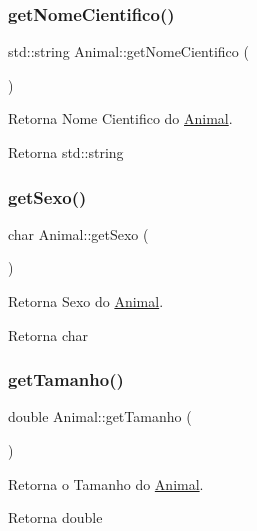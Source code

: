 \subsubsection{\texorpdfstring{get\+Nome\+Cientifico()}{getNomeCientifico()}}
{\footnotesize\ttfamily std\+::string Animal\+::get\+Nome\+Cientifico (\begin{DoxyParamCaption}{ }\end{DoxyParamCaption})}



Retorna Nome Cientifico do \hyperlink{classAnimal}{Animal}. 

\begin{DoxyReturn}{Retorna}
std\+::string 
\end{DoxyReturn}
\mbox{\label{classAnimal_a7349027418d900a9cd7cfc32001b6f7d}} 
\subsubsection{\texorpdfstring{get\+Sexo()}{getSexo()}}
{\footnotesize\ttfamily char Animal\+::get\+Sexo (\begin{DoxyParamCaption}{ }\end{DoxyParamCaption})}



Retorna Sexo do \hyperlink{classAnimal}{Animal}. 

\begin{DoxyReturn}{Retorna}
char 
\end{DoxyReturn}
\mbox{\label{classAnimal_a3936ff4ad07fee3173db2a9dff52c706}} 
\subsubsection{\texorpdfstring{get\+Tamanho()}{getTamanho()}}
{\footnotesize\ttfamily double Animal\+::get\+Tamanho (\begin{DoxyParamCaption}{ }\end{DoxyParamCaption})}



Retorna o Tamanho do \hyperlink{classAnimal}{Animal}. 

\begin{DoxyReturn}{Retorna}
double 
\end{DoxyReturn}
\mbox{\label{classAnimal_ac238dd4fa3762c7bc97f7baebac2d828}} 
